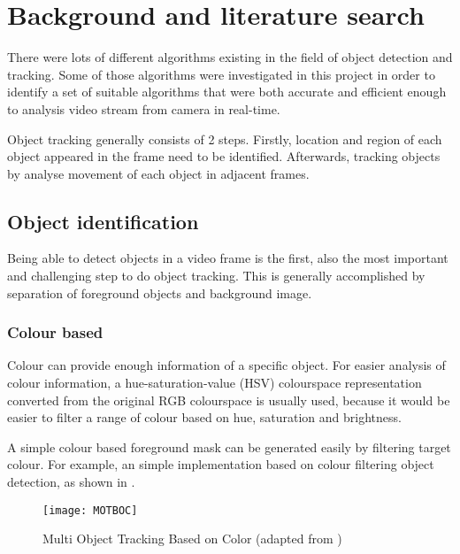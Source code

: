 \chapter{Background and literature search}

There were lots of different algorithms existing in the field of object detection and tracking. Some of those algorithms were investigated in this project in order to identify a set of suitable algorithms that were both accurate and efficient enough to analysis video stream from camera in real-time.

Object tracking generally consists of 2 steps. Firstly, location and region of each object appeared in the frame need to be identified. Afterwards, tracking objects by analyse movement of each object in adjacent frames.

\section{Object identification}

Being able to detect objects in a video frame is the first, also the most important and challenging step to do object tracking. This is generally accomplished by separation of foreground objects and background image.

\subsection{Colour based}
\label{bgs:colour}

Colour can provide enough information of a specific object. For easier analysis of colour information, a hue-saturation-value (HSV) colourspace \cite[p.~301]{colourspace} representation converted from the original RGB colourspace is usually used, because it would be easier to filter a range of colour based on hue, saturation and brightness.

A simple colour based foreground mask can be generated easily by filtering target colour. For example, an simple implementation \cite{MOTBOC.git} based on colour filtering object detection, as shown in .

\begin{figure}[H]
  \centering
  \texttt{[image: MOTBOC]}
  \caption{Multi Object Tracking Based on Color (adapted from \cite{MOTBOC.git})}
  \label{Figure:MOTBOC}
\end{figure}

